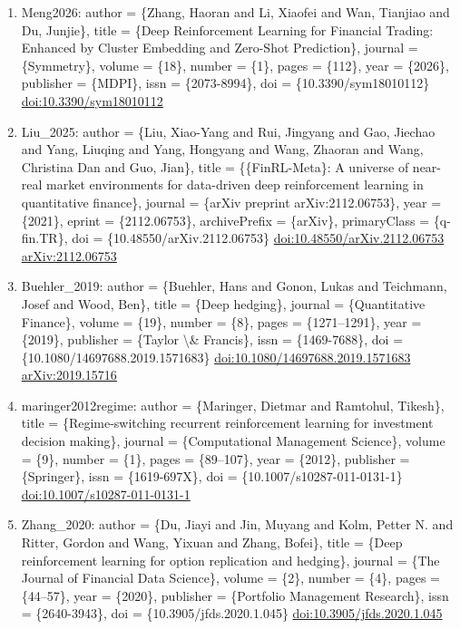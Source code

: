\documentclass[11pt]{article}
\begin{document}
\begin{enumerate}[leftmargin=*]
  \item Meng2026: author = \{Zhang, Haoran and Li, Xiaofei and Wan, Tianjiao and Du, Junjie\}, title = \{Deep Reinforcement Learning for Financial Trading: Enhanced by Cluster Embedding and Zero-Shot Prediction\}, journal = \{Symmetry\}, volume = \{18\}, number = \{1\}, pages = \{112\}, year = \{2026\}, publisher = \{MDPI\}, issn = \{2073-8994\}, doi = \{10.3390/sym18010112\} \href{https://doi.org/10.3390/sym18010112}{doi:10.3390/sym18010112}
  \item Liu\_2025: author = \{Liu, Xiao-Yang and Rui, Jingyang and Gao, Jiechao and Yang, Liuqing and Yang, Hongyang and Wang, Zhaoran and Wang, Christina Dan and Guo, Jian\}, title = \{\{FinRL-Meta\}: A universe of near-real market environments for data-driven deep reinforcement learning in quantitative finance\}, journal = \{arXiv preprint arXiv:2112.06753\}, year = \{2021\}, eprint = \{2112.06753\}, archivePrefix = \{arXiv\}, primaryClass = \{q-fin.TR\}, doi = \{10.48550/arXiv.2112.06753\} \href{https://doi.org/10.48550/arXiv.2112.06753}{doi:10.48550/arXiv.2112.06753} \href{https://arxiv.org/abs/2112.06753}{arXiv:2112.06753}
  \item Buehler\_2019: author = \{Buehler, Hans and Gonon, Lukas and Teichmann, Josef and Wood, Ben\}, title = \{Deep hedging\}, journal = \{Quantitative Finance\}, volume = \{19\}, number = \{8\}, pages = \{1271--1291\}, year = \{2019\}, publisher = \{Taylor \textbackslash{}\& Francis\}, issn = \{1469-7688\}, doi = \{10.1080/14697688.2019.1571683\} \href{https://doi.org/10.1080/14697688.2019.1571683}{doi:10.1080/14697688.2019.1571683} \href{https://arxiv.org/abs/2019.15716}{arXiv:2019.15716}
  \item maringer2012regime: author = \{Maringer, Dietmar and Ramtohul, Tikesh\}, title = \{Regime-switching recurrent reinforcement learning for investment decision making\}, journal = \{Computational Management Science\}, volume = \{9\}, number = \{1\}, pages = \{89--107\}, year = \{2012\}, publisher = \{Springer\}, issn = \{1619-697X\}, doi = \{10.1007/s10287-011-0131-1\} \href{https://doi.org/10.1007/s10287-011-0131-1}{doi:10.1007/s10287-011-0131-1}
  \item Zhang\_2020: author = \{Du, Jiayi and Jin, Muyang and Kolm, Petter N. and Ritter, Gordon and Wang, Yixuan and Zhang, Bofei\}, title = \{Deep reinforcement learning for option replication and hedging\}, journal = \{The Journal of Financial Data Science\}, volume = \{2\}, number = \{4\}, pages = \{44--57\}, year = \{2020\}, publisher = \{Portfolio Management Research\}, issn = \{2640-3943\}, doi = \{10.3905/jfds.2020.1.045\} \href{https://doi.org/10.3905/jfds.2020.1.045}{doi:10.3905/jfds.2020.1.045}

\end{enumerate}
\end{document}
